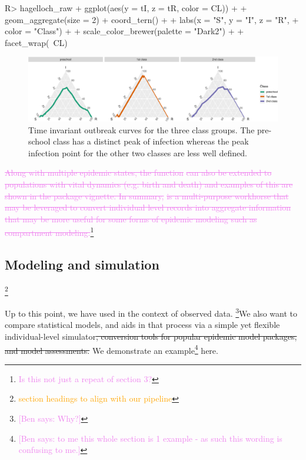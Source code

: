 \documentclass[
  shortnames]{jss}
\begin{document}
\begin{CodeChunk}
\begin{CodeInput}
R> hagelloch_raw %
+   ggplot(aes(y = tI, z = tR, color = CL)) +
+   geom_aggregate(size = 2) + coord_tern() +
+   labs(x = "S", y = "I", z = "R",
+        color = "Class") +
+   scale_color_brewer(palette = "Dark2") +
+   facet_wrap(~CL)
\end{CodeInput}
\begin{figure}[H]

{\centering \includegraphics{Figs/unnamed-chunk-25-1} 

}

\caption{\label{fig:tern-class-data}Time invariant outbreak curves for the three class groups.  The pre-school class has a distinct peak of infection whereas the peak infection point for the other two classes are less well defined.}\label{fig:unnamed-chunk-25}
\end{figure}
\end{CodeChunk}

\textcolor{violet}{\sout{Along with multiple epidemic states, the function}}
\textcolor{violet}{\sout{can also be extended to populations with vital dynamics (e.g. birth and death) and examples of this are shown in the package vignette.  In summary, }}
\textcolor{violet}{\sout{is a multi-purpose workhorse that may be leveraged to convert individual level records into aggregate information that may be more useful for some forms of epidemic modeling such as compartment modeling.}}\footnote{\textcolor{violet}{Is this not just a repeat of section 3?}}

\hypertarget{modeling-and-simulation-1}{%
\subsection{Modeling and simulation}\label{modeling-and-simulation-1}}

\footnote{\textcolor{orange}{section headings to align with our pipeline}}

Up to this point, we have used  in the context of
observed data. \footnote{\textcolor{violet}{[Ben says: Why?]}}We also
want to compare statistical models, and  aids in that
process via a simple yet flexible individual-level
simulator\sout{, conversion tools for popular epidemic model packages, and model assessments.}
We demonstrate an
example\footnote{\textcolor{violet}{[Ben says: to me this whole section is 1 example - as such this wording is confusing to me.]}}
here.
\end{document}

